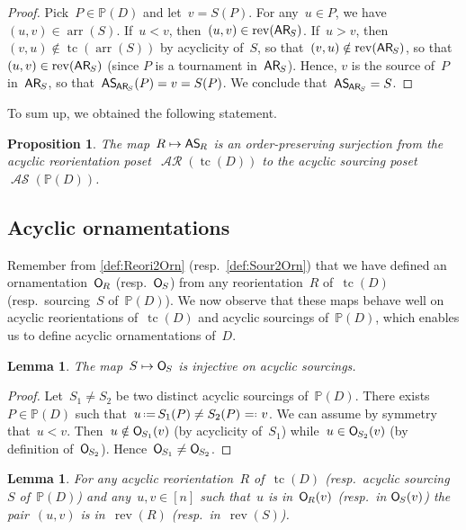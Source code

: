\documentclass{amsart}
\newtheorem{proposition}[theorem]{Proposition}
\newtheorem{lemma}[theorem]{Lemma}
\theoremstyle{definition}
\renewcommand{\c}[1]{\mathcal{#1}} %
\newcommand{\eqdef}{\mbox{\,\raisebox{0.2ex}{\scriptsize\ensuremath{\mathrm:}}\ensuremath{=}\,}} %
\newcommand{\defeq}{\mbox{~\ensuremath{=}\raisebox{0.2ex}{\scriptsize\ensuremath{\mathrm:}} }} %
\DeclareMathOperator{\tc}{tc} %
\newcommand{\mymap}[2]{\mathsf{#1}_{\hspace{-.7pt}#2}}
\newcommand{\orn}[1]{\mymap{O}{#1}}  %
\DeclareMathOperator{\AReori}{\c{AR}}  %
\newcommand{\areori}[1]{\mymap{AR}{#1}}  %
\DeclareMathOperator{\rev}{rev} %
\DeclareMathOperator{\ASour}{\mathcal{AS}}  %
\newcommand{\asour}[1]{\mymap{AS}{#1}}  %
\DeclareMathOperator{\arr}{arr} %
\newcommand{\PP}{\mathbb P} %
\begin{document}
\begin{proof}
Pick~$P \in \PP(D)$ and let~$v = S(P)$.
For any~$u \in P$, we have~$(u,v) \in \arr(S)$.
If~$u < v$, then~$(u,v) \in \rev(\areori{S})$.
If~$u > v$, then~$(v,u) \notin \tc(\arr(S))$ by acyclicity of~$S$, so that~$(v,u) \notin \rev(\areori{S})$, so that~$(u,v) \in \rev(\areori{S})$ (since $P$ is a tournament in~$\areori{S}$).
Hence, $v$ is the source of~$P$ in~$\areori{S}$, so that~$\asour{\areori{S}}(P) = v = S(P)$.
We conclude that~$\asour{\areori{S}} = S$. 
\end{proof}

To sum up, we obtained the following statement.

\begin{proposition}
\label{prop:AReori2ASour}
The map~$R \mapsto \asour{R}$ is an order-preserving surjection from the acyclic reorientation poset~$\AReori(\tc(D))$ to the acyclic sourcing poset~$\ASour(\PP(D))$.
\end{proposition}


\subsection{Acyclic ornamentations}
\label{subsec:acyclicOrnamentations}

Remember from \cref{def:Reori2Orn} (resp.~\cref{def:Sour2Orn}) that we have defined an ornamentation~$\orn{R}$ (resp.~$\orn{S}$) from any reorientation~$R$ of~$\tc(D)$ (resp.~sourcing~$S$ of~$\PP(D)$).
We now observe that these maps behave well on acyclic reorientations of~$\tc(D)$ and acyclic sourcings of~$\PP(D)$, which enables us to define acyclic ornamentations of~$D$.

\begin{lemma}
\label{lem:ASour2AOrn1}
The map~$S \mapsto \orn{S}$ is injective on acyclic sourcings.
\end{lemma}

\begin{proof}
Let~$S_1 \ne S_2$ be two distinct acyclic sourcings of~$\PP(D)$.
There exists~$P \in \PP(D)$ such that~$u \eqdef S_1(P) \ne S_2(P) \defeq v$.
We can assume by symmetry that~$u < v$.
Then~$u \notin \orn{S_1}(v)$ (by acyclicity of~$S_1$) while~$u \in \orn{S_2}(v)$ (by definition of~$\orn{S_2}$).
Hence~$\orn{S_1} \ne \orn{S_2}$.
\end{proof}

\begin{lemma}
\label{lem:acyclicSimplifiesDef}
For any acyclic reorientation~$R$ of~$\tc(D)$ (resp.~acyclic sourcing~$S$ of~$\PP(D)$) and any~$u,v \in [n]$ such that~$u$ is in~$\orn{R}(v)$ (resp.~in $\orn{S}(v)$) the pair~$(u,v)$ is in~$\rev(R)$ (resp.~in~$\rev(S)$).
\end{lemma}
\end{document}
